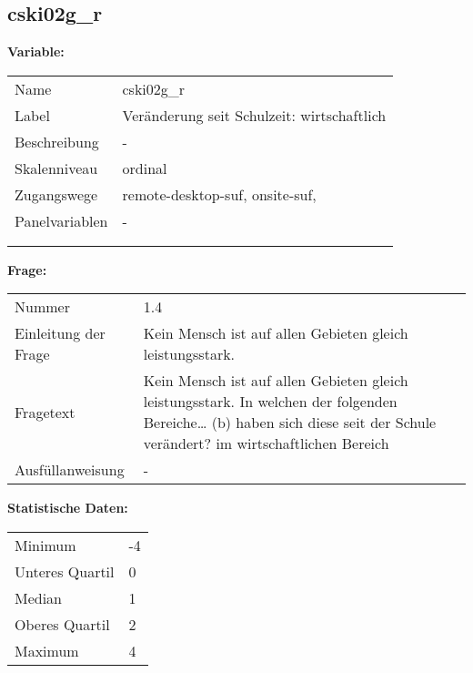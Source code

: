 	
	
	\subsection{cski02g\_r}
	\label{subSection:cski02g_r}

	\noindent\textbf{Variable:}\\
		\begin{tabular}{lL{11.3cm}}
			\label{tableVariable:cski02g_r}
			Name & cski02g\_r \\
			Label & Veränderung seit Schulzeit: wirtschaftlich \\
			Beschreibung & - \\
			Skalenniveau & ordinal \\
			Zugangswege &
				remote-desktop-suf,
				onsite-suf,
 \\
			Panelvariablen & -
			 \\
			 \\
 \\
		\end{tabular}

		\vspace*{1 cm}
		\noindent\textbf{Frage:}\\
		\begin{tabular}{lL{11.3cm}}
			\label{tableQuestion:cski02g_r}
			Nummer & 1.4 \\
			Einleitung der Frage & Kein Mensch ist auf allen Gebieten gleich leistungsstark. \\
			Fragetext & Kein Mensch ist auf allen Gebieten gleich leistungsstark. In welchen der folgenden Bereiche…
(b) haben sich diese seit der Schule verändert?
im wirtschaftlichen Bereich \\
			Ausfüllanweisung & - \\
		\end{tabular}


		\vspace*{1 cm}
		\noindent\textbf{Statistische Daten:}\\
			\begin{tabular}{ll}
				\label{tableStatistics:cski02g_r}
					Minimum & -4 \\
					Unteres Quartil & 0 \\
					Median & 1 \\
					Oberes Quartil & 2 \\
					Maximum & 4 \\
			\end{tabular}



